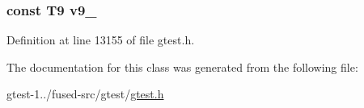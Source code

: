 \hypertarget{classtesting_1_1internal_1_1ValueArray48_a6356e16cf54a9dfac8525f20242af31e}{
\subsubsection[{v9\-\_\-}]{\setlength{\rightskip}{0pt plus 5cm}const \-T9 {\bf v9\-\_\-}}}\label{d5/d2c/classtesting_1_1internal_1_1ValueArray48_a6356e16cf54a9dfac8525f20242af31e}


\-Definition at line 13155 of file gtest.\-h.



\-The documentation for this class was generated from the following file\-:\begin{DoxyCompactItemize}
\item 
gtest-\/1../fused-\/src/gtest/\hyperlink{fused-src_2gtest_2gtest_8h}{gtest.\-h}\end{DoxyCompactItemize}
